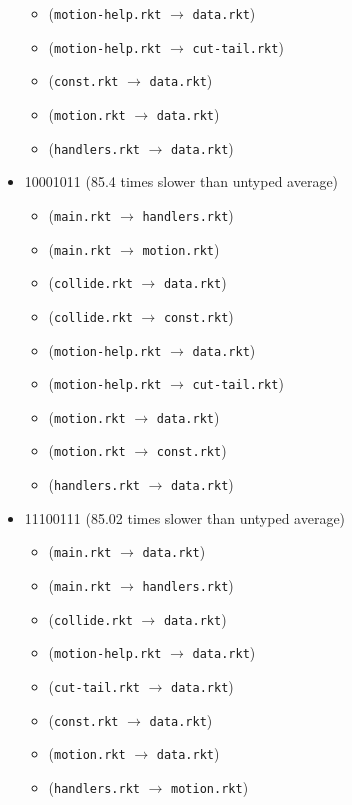 \documentclass{article}
\newcommand{\mono}[1]{\texttt{#1}}
\begin{document}
\begin{itemize}
\begin{itemize}
  \item (\mono{motion-help.rkt} $\rightarrow$ \mono{data.rkt})
  \item (\mono{motion-help.rkt} $\rightarrow$ \mono{cut-tail.rkt})
  \item (\mono{const.rkt} $\rightarrow$ \mono{data.rkt})
  \item (\mono{motion.rkt} $\rightarrow$ \mono{data.rkt})
  \item (\mono{handlers.rkt} $\rightarrow$ \mono{data.rkt})
  \end{itemize}
\item 10001011 (85.4 times slower than untyped average)
  \begin{itemize}
  \item (\mono{main.rkt} $\rightarrow$ \mono{handlers.rkt})
  \item (\mono{main.rkt} $\rightarrow$ \mono{motion.rkt})
  \item (\mono{collide.rkt} $\rightarrow$ \mono{data.rkt})
  \item (\mono{collide.rkt} $\rightarrow$ \mono{const.rkt})
  \item (\mono{motion-help.rkt} $\rightarrow$ \mono{data.rkt})
  \item (\mono{motion-help.rkt} $\rightarrow$ \mono{cut-tail.rkt})
  \item (\mono{motion.rkt} $\rightarrow$ \mono{data.rkt})
  \item (\mono{motion.rkt} $\rightarrow$ \mono{const.rkt})
  \item (\mono{handlers.rkt} $\rightarrow$ \mono{data.rkt})
  \end{itemize}
\item 11100111 (85.02 times slower than untyped average)
  \begin{itemize}
  \item (\mono{main.rkt} $\rightarrow$ \mono{data.rkt})
  \item (\mono{main.rkt} $\rightarrow$ \mono{handlers.rkt})
  \item (\mono{collide.rkt} $\rightarrow$ \mono{data.rkt})
  \item (\mono{motion-help.rkt} $\rightarrow$ \mono{data.rkt})
  \item (\mono{cut-tail.rkt} $\rightarrow$ \mono{data.rkt})
  \item (\mono{const.rkt} $\rightarrow$ \mono{data.rkt})
  \item (\mono{motion.rkt} $\rightarrow$ \mono{data.rkt})
  \item (\mono{handlers.rkt} $\rightarrow$ \mono{motion.rkt})

\end{itemize}
\end{itemize}
\end{document}

